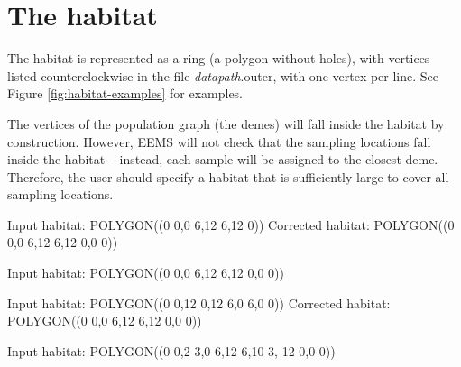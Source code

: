 \documentclass[a4paper,10pt,DIV=15,mpinclude=true]{scrartcl}
\begin{document}
\section{The habitat} \label{sec:habitat}

The habitat is represented as a ring (a polygon without holes), with vertices listed counterclockwise in the file \textit{datapath}.outer, with one vertex per line. See Figure \ref{fig:habitat-examples} for examples.

The vertices of the population graph (the demes) will fall inside the habitat by construction. However, EEMS will not check that the sampling locations fall inside the habitat -- instead, each sample will be assigned to the closest deme. Therefore, the user should specify a habitat that is sufficiently large to cover all sampling locations.

\begin{myverbbox}{\habitatA}
Input habitat: 
  POLYGON((0 0,0 6,12 6,12 0))
Corrected habitat: 
  POLYGON((0 0,0 6,12 6,12 0,0 0))
  
  
\end{myverbbox}
\begin{myverbbox}{\habitatB}
Input habitat: 
  POLYGON((0 0,0 6,12 6,12 0,0 0))
    


  
\end{myverbbox}
\begin{myverbbox}{\habitatC}
Input habitat: 
  POLYGON((0 0,12 0,12 6,0 6,0 0))
Corrected habitat: 
  POLYGON((0 0,0 6,12 6,12 0,0 0))  


\end{myverbbox}
\begin{myverbbox}{\habitatD}
Input habitat: 
  POLYGON((0 0,2 3,0 6,12 6,10 3,
           12 0,0 0))
  

  
\end{myverbbox}
 
\end{document}
